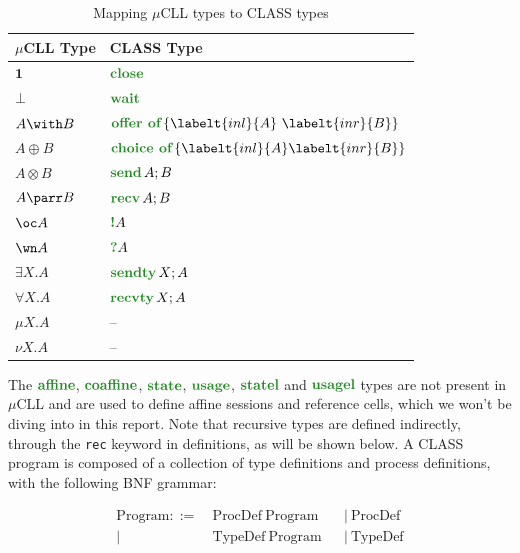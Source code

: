 \begin{table}
    \centering
    \caption{Mapping $\mu$CLL types to CLASS types}
    \label{tab:CLASSTypes}
    \begin{tabular}{ll}
        \toprule
        $\mu$CLL Type & CLASS Type                                  \\
        \midrule
        $\mathbf{1}$  & $\closet$                                   \\
        $\bot$        & $\waitt$                                    \\
        $A \with B$   & $\offert{\labelt{inl}{A}\ \labelt{inr}{B}}$ \\
        $A \oplus B$  & $\choicet{\labelt{inl}{A} \labelt{inr}{B}}$ \\
        $A \otimes B$ & $\sendt{A}{B}$                              \\
        $A \parr B$   & $\recvt{A}{B}$                              \\
        $\oc A$       & $\bangt{A}$                                 \\
        $\wn A$       & $\whynott{A}$                               \\
        $\exists X.A$ & $\sendtyt{X}{A}$                            \\
        $\forall X.A$ & $\recvtyt{X}{A}$                            \\
        $\mu X.A$     & --                                          \\
        $\nu X.A$     & --                                          \\
        \bottomrule
    \end{tabular}
\end{table}

The $\classt{affine}$, $\classt{coaffine}$, $\classt{state}$, $\classt{usage}$, $\classt{statel}$ and $\classt{usagel}$ types are not present in $\mu$CLL and are used to define affine sessions and reference cells, which we won't be diving into in this report. Note that recursive types are defined indirectly, through the \texttt{rec} keyword in definitions, as will be shown below. A CLASS program is composed of a collection of type definitions and process definitions, with the following BNF grammar:

\begin{align*}
    \text{Program} ::=\  & \text{ProcDef}\ \text{Program} &  & |\ \text{ProcDef} \\
    |\                   & \text{TypeDef}\ \text{Program} &  & |\ \text{TypeDef}
\end{align*}

